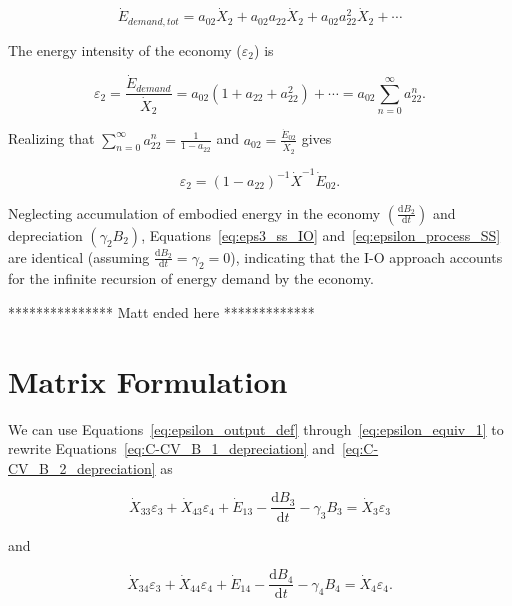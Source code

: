 \begin{equation} \label{eq:E_dot_demand_SS}
	\dot{E}_{demand,tot} 
	= a_{02}\dot{X}_{2} 
	+ a_{02}a_{22}\dot{X}_{2} 
	+ a_{02}a_{22}^2\dot{X}_{2} 
	+ \cdots
\end{equation}

The energy intensity of the economy ($\varepsilon_{2}$) is 

\begin{equation} \label{eq:epsilon_process_SS_intermediate}
	\varepsilon_{2} 
	= \frac{\dot{E}_{demand}}{\dot{X}_{2}} 
	= a_{02}(1 + a_{22} + a_{22}^2) + \cdots 
	= a_{02}\sum_{n=0}^{\infty}a_{22}^{n}.
\end{equation}

Realizing that $\sum_{n=0}^{\infty}a_{22}^{n} 
= \frac{1}{1-a_{22}}$ and $a_{02} 
= \frac{\dot{E}_{02}}{\dot{X}_{2}}$ gives

\begin{equation} \label{eq:epsilon_process_SS}
	\varepsilon_{2} = {(1-a_{22})}^{-1} \dot{X}^{-1} \dot{E}_{02}.
\end{equation}

Neglecting accumulation of embodied energy in the economy
$\left(\frac{\mathrm{d}B_{2}}{\mathrm{d}t}\right)$ 
and depreciation $\left(\gamma_{2}B_{2}\right)$, 
Equations~\ref{eq:eps3_ss_IO} and~\ref{eq:epsilon_process_SS} are identical 
(assuming $\frac{\mathrm{d}B_{2}}{\mathrm{d}t} =\gamma_{2} = 0$), 
indicating that the I-O approach accounts 
for the infinite recursion of energy demand by the economy.


*************** Matt ended here *************

\section{Matrix Formulation}

We can use Equations~\ref{eq:epsilon_output_def} 
through~\ref{eq:epsilon_equiv_1} to rewrite 
Equations~\ref{eq:C-CV_B_1_depreciation} 
and~\ref{eq:C-CV_B_2_depreciation} as

\begin{equation} \label{eq:CV_B_3_with_eps}
	\dot{X}_{33}\varepsilon_{3} + \dot{X}_{43}\varepsilon_{4} + \dot{E}_{13} - \frac{\mathrm{d}B_{3}}{\mathrm{d}t} - \gamma_{3}B_{3} = \dot{X}_{3}\varepsilon_{3}
\end{equation}

\noindent and 

\begin{equation} \label{eq:CV_B_4_with_eps}
	\dot{X}_{34}\varepsilon_{3} + \dot{X}_{44}\varepsilon_{4} + \dot{E}_{14} - \frac{\mathrm{d}B_{4}}{\mathrm{d}t} - \gamma_{4}B_{4} = \dot{X}_{4}\varepsilon_{4}.
\end{equation}

